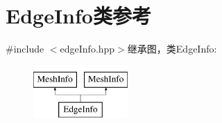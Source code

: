 \hypertarget{classEdgeInfo}{
\section{EdgeInfo类参考}
\label{classEdgeInfo}
}


{\ttfamily \#include $<$edgeInfo.hpp$>$}继承图，类EdgeInfo:\begin{figure}[H]
\begin{center}
\leavevmode
\includegraphics[height=2cm]{classEdgeInfo}
\end{center}
\end{figure}
